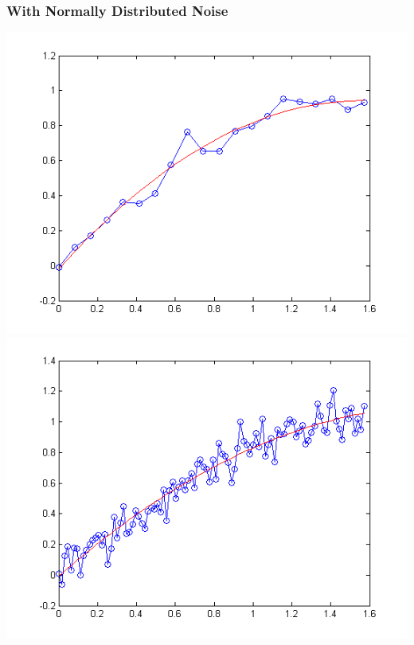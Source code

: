 \documentclass[12pt]{article}
\begin{document}
\subsubsection*{With Normally Distributed Noise}
\includegraphics[scale=.5]{plot9.png}
\includegraphics[scale=.5]{plot10.png}
\end{document}
